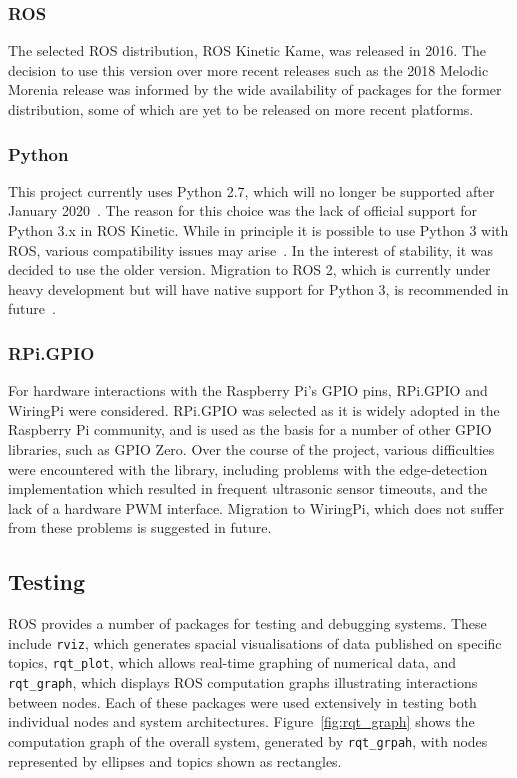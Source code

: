 \subsubsection{ROS}
The selected ROS distribution, ROS Kinetic Kame, was released in 2016. The
decision to use this version over more recent releases such as the 2018
Melodic Morenia release was informed by the wide availability of packages
for the former distribution, some of which are yet to be released on more
recent platforms.

\subsubsection{Python}
This project currently uses Python 2.7, which will no longer be supported
after January 2020~\cite{python2-eol}. The reason for this choice was the
lack of official support for Python 3.x in ROS Kinetic. While in principle
it is possible to use Python 3 with ROS, various compatibility issues may
arise~\cite{medium-ros-python3}. In the interest of stability,
it was decided to use the older version. Migration to ROS 2, which is
currently under heavy development but will have native support for Python
3, is recommended in future~\cite{ros2}.

\subsubsection{RPi.GPIO}
For hardware interactions with the Raspberry Pi's GPIO pins, RPi.GPIO and
WiringPi were considered. RPi.GPIO was selected as it is widely adopted in
the Raspberry Pi community, and is used as the basis for a number of other
GPIO libraries, such as GPIO Zero. 
Over the course of the project, various difficulties were encountered with
the library, including problems with the edge-detection implementation which
resulted in frequent ultrasonic sensor timeouts, and the lack of a hardware
PWM interface. Migration to WiringPi, which does not suffer from these problems
is suggested in future.


\subsection{Testing}\label{soft/ROS/test}
ROS provides a number of packages for testing and debugging systems. These
include \verb|rviz|, which generates spacial visualisations of data published
on specific topics, \verb|rqt_plot|, which allows real-time graphing of
numerical data, and \verb|rqt_graph|, which displays ROS computation graphs
illustrating interactions between nodes. Each of these packages were used
extensively in testing both individual nodes and system architectures.
Figure~\ref{fig:rqt_graph} shows the computation graph of the overall system,
generated by \verb|rqt_grpah|, with nodes represented by ellipses and topics
shown as rectangles.

